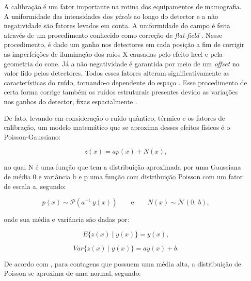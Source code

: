A calibração é um fator importante na rotina dos equipamentos de mamografia. A uniformidade das intensidades dos \textit{pixels} ao longo do detector e a não negatividade são fatores levados em conta. A uniformidade do campo é feita através de um procedimento conhecido como correção de \textit{flat-field} \cite{marshall2017handbook}. Nesse procedimento, é dado um ganho nos detectores em cada posição a fim de corrigir as imperfeições de iluminação dos raios X causadas pelo efeito heel e pela geometria do cone. Já a não negatividade é garantida por meio de um \textit{offset} no valor lido pelos detectores. Todos esses fatores alteram significativamente as características do ruído, tornando-o  dependente do espaço \cite{borges2017pipeline,borges2017method, borges2018restoration,brito2018application,guerrero2018}. Esse procedimento de certa forma corrige também os ruídos estruturais presentes devido as variações nos ganhos do detector, fixas espacialmente \cite{VanEngen2013,marshall2017handbook}.

De fato, levando em consideração o ruído quântico, térmico e os fatores de calibração, um modelo matemático que se aproxima desses efeitos físicos é o Poisson-Gaussiano:

\begin{equation}
z(x) = ap(x) + N(x),
\label{eq:eqCapRuidoPossionGaussiano}
\end{equation}

\noindent no qual N é uma função que tem a distribuição aproximada por uma Gaussiana de média 0 e variância b e p uma função com distribuição Poisson com um fator de escala a, segundo:

\begin{equation}
p(x) \sim \mathcal{P}(a^{-1}\,y(x)) \qquad \text{e}  \qquad  N(x) \sim \mathcal{N}(0,\,b),
\label{eq:eqCapRuidoPossionGaussiano1}
\end{equation}

\noindent onde sua média e variância são dadas por:

\begin{equation}
E\{z(x)\mid y(x)\} =  y(x),
\label{eq:eqCapRuidoPossionGaussianoMedia}
\end{equation}

\begin{equation}
Var\{z(x)\mid y(x)\} = ay(x) + b.
\label{eq:eqCapRuidoPossionGaussianoVar}
\end{equation}

De acordo com , para contagens que possuem uma média alta, a distribuição de Poisson se aproxima de uma normal, segundo:

